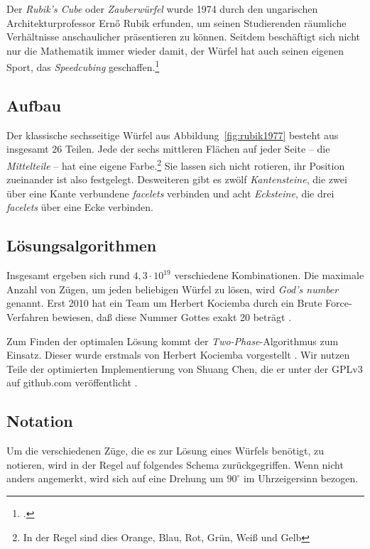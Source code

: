 Der \emph{Rubik's Cube} oder \emph{Zauberwürfel} wurde 1974 durch den
ungarischen Architekturprofessor Ernő Rubik erfunden, um seinen Studierenden
räumliche Verhältnisse anschaulicher präsentieren zu können. Seitdem beschäftigt
sich nicht nur die Mathematik immer wieder damit, der Würfel hat auch seinen
eigenen Sport, das \emph{Speedcubing} geschaffen.\footcite{rubik:history} 

\subsection{Aufbau}  %

Der klassische sechsseitige Würfel aus Abbildung~\ref{fig:rubik1977} besteht aus
insgesamt 26 Teilen. Jede der sechs mittleren Flächen auf jeder Seite – die
\emph{Mittelteile} – hat eine eigene Farbe.\footnote{In der Regel sind dies
Orange, Blau, Rot, Grün, Weiß und Gelb} Sie lassen sich nicht rotieren, ihr
Position zueinander ist also festgelegt. Desweiteren gibt es zwölf
\emph{Kantensteine}, die zwei über eine Kante verbundene \emph{facelets}
verbinden und acht \emph{Ecksteine}, die drei \emph{facelets} über eine Ecke
verbinden.

\subsection{Lösungsalgorithmen}  %

Insgesamt ergeben sich rund \( 4,3 \cdot {10}^{19} \) verschiedene
Kombinationen. Die maximale Anzahl von Zügen, um jeden beliebigen Würfel zu
lösen, wird \emph{God's number} genannt. Erst 2010 hat ein Team um Herbert
Kociemba durch ein Brute Force-Verfahren bewiesen, daß diese Nummer Gottes exakt
20 beträgt \citep{rubik:godsnumber}.

Zum Finden der optimalen Lösung kommt der \emph{Two-Phase}-Algorithmus zum
Einsatz. Dieser wurde erstmals von Herbert Kociemba vorgestellt
\citep{rubik:kociemba}. Wir nutzen Teile der optimierten Implementierung
von Shuang Chen, die er unter der GPLv3 auf github.com veröffentlicht
\citep{rubik:chen}.

\subsection{Notation}  %

Um die verschiedenen Züge, die es zur Lösung eines Würfels benötigt, zu
notieren, wird in der Regel auf folgendes Schema zurückgegriffen. Wenn nicht
anders angemerkt, wird sich auf eine Drehung um $90^\circ$ im Uhrzeigersinn
bezogen.

